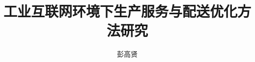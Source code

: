 \documentclass[doctor]{hnuthesis}
\title{工业互联网环境下生产服务与配送优化方法研究}
\author{彭高贤}
\begin{document}
\maketitle


\tableofcontents
\begingroup
    \renewcommand*{\addvspace}[1]{}
        \listoffigures
        \newpage

        \listoftables
        \newpage
\endgroup

\mainmatter





\appendix



\backmatter

\end{document}

